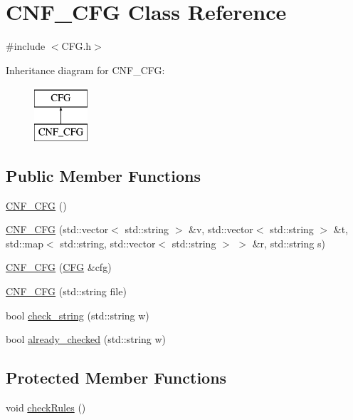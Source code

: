 \hypertarget{classCNF__CFG}{\section{C\-N\-F\-\_\-\-C\-F\-G Class Reference}
\label{classCNF__CFG}
}


{\ttfamily \#include $<$C\-F\-G.\-h$>$}

Inheritance diagram for C\-N\-F\-\_\-\-C\-F\-G\-:\begin{figure}[H]
\begin{center}
\leavevmode
\includegraphics[height=2.000000cm]{da/d5c/classCNF__CFG}
\end{center}
\end{figure}
\subsection*{Public Member Functions}
\begin{DoxyCompactItemize}
\item 
\hyperlink{classCNF__CFG_a3dfe36c6d4b3c69bd4217d71f0fe4746}{C\-N\-F\-\_\-\-C\-F\-G} ()
\item 
\hyperlink{classCNF__CFG_a1d22901e8e4c8e25562d4095980537f5}{C\-N\-F\-\_\-\-C\-F\-G} (std\-::vector$<$ std\-::string $>$ \&v, std\-::vector$<$ std\-::string $>$ \&t, std\-::map$<$ std\-::string, std\-::vector$<$ std\-::string $>$ $>$ \&r, std\-::string s)
\item 
\hyperlink{classCNF__CFG_aaca2a5cc2e21b1b2e45ddecf3aed65c9}{C\-N\-F\-\_\-\-C\-F\-G} (\hyperlink{classCFG}{C\-F\-G} \&cfg)
\item 
\hyperlink{classCNF__CFG_a2cde09b5176c556704653475c299952d}{C\-N\-F\-\_\-\-C\-F\-G} (std\-::string file)
\item 
bool \hyperlink{classCNF__CFG_a07436f4035c9fba1cd09761cdec0b02e}{check\-\_\-string} (std\-::string w)
\item 
bool \hyperlink{classCNF__CFG_a418ddb53a7700e331f2791e59d3c1d1f}{already\-\_\-checked} (std\-::string w)
\end{DoxyCompactItemize}
\subsection*{Protected Member Functions}
\begin{DoxyCompactItemize}
\item 
void \hyperlink{classCNF__CFG_a2e368e4718364caf95866d1d692fd49d}{check\-Rules} ()
\end{DoxyCompactItemize}
